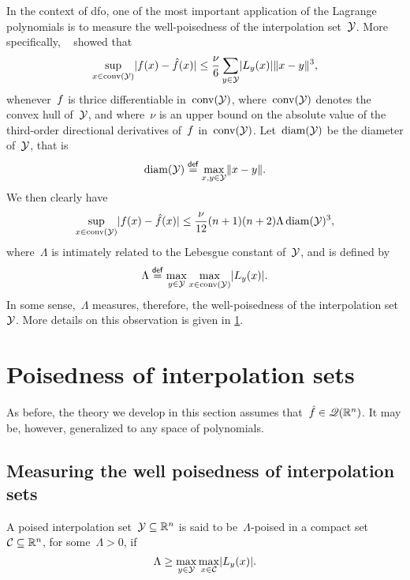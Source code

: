 In the context of \gls{dfo}, one of the most important application of the Lagrange polynomials is to measure the well-poisedness of the interpolation set~$\xpt$.
More specifically, \citeauthor{Ciarlet_Raviart_1972}~\cite{Ciarlet_Raviart_1972} showed that
\begin{equation*}
    \sup_{x \in \conv(\xpt)} \abs{\obj(x) - \objm(x)} \le \frac{\nu}{6} \sum_{y \in \xpt} \abs{\lagp[y](x)} \norm{x - y}^3,
\end{equation*}
whenever~$f$ is thrice differentiable in~$\conv(\xpt)$, where~$\conv(\xpt)$ denotes the convex hull of~$\xpt$, and where~$\nu$ is an upper bound on the absolute value of the third-order directional derivatives of~$f$ in~$\conv(\xpt)$.
Let~$\diam(\xpt)$ be the diameter of~$\xpt$, that is
\begin{equation*}
    \diam(\xpt) \eqdef \max_{x, y \in \xpt} \norm{x - y}.
\end{equation*}
We then clearly have
\begin{equation*}
    \sup_{x \in \conv(\xpt)} \abs{\obj(x) - \objm(x)} \le \frac{\nu}{12} (n + 1) (n + 2) \Lambda \diam(\xpt)^3,
\end{equation*}
where~$\Lambda$ is intimately related to the Lebesgue constant of~$\xpt$, and is defined by
\begin{equation*}
    \Lambda \eqdef \max_{y \in \xpt} \max_{x \in \conv(\xpt)} \abs{\lagp[y](x)}.
\end{equation*}
In some sense,~$\Lambda$ measures, therefore, the well-poisedness of the interpolation set~$\xpt$.
More details on this observation is given in \cref{sec:poisedness}.

\section{Poisedness of interpolation sets}
\label{sec:poisedness}

As before, the theory we develop in this section assumes that~$\objm \in \qpoly$.
It may be, however, generalized to any space of polynomials.

\subsection{Measuring the well poisedness of interpolation sets}

\begin{definition}
    A poised interpolation set~$\xpt \subseteq \R^n$ is said to be~$\Lambda$-poised in a compact set~$\mathcal{C} \subseteq \mathbb{R}^n$, for some~$\Lambda > 0$, if
    \begin{equation*}
        \Lambda \ge \max_{y \in \xpt} \max_{x \in \mathcal{C}} \abs{\lagp[y](x)}.
    \end{equation*}
\end{definition}

